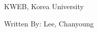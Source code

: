 \begin{titlepage}
    \centering
    \vspace*{35mm}
    \par\vspace{5mm}
    {\large KWEB, Korea University}
    \par\vspace{20mm}
    {\booktitle}
    \par\vspace{30mm}
    {\large Written By: Lee, Chanyoung}
    \par\vspace{30mm}
    {\large\version}
\end{titlepage}

\dominitoc
\tableofcontents
\setimgdir
